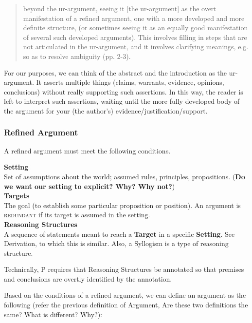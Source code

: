 \documentclass{article}
\begin{document}
\begin{quote}
beyond the ur-argument, seeing it [the ur-argument] as the overt manifestation of a refined argument, one with a more developed and more definite structure, (or sometimes seeing it as an equally good manifestation of several such developed arguments).  This involves filling in steps that are not articulated in the ur-argument, and it involves clarifying meanings, e.g. so as to resolve ambiguity (pp. 2-3). 
\end{quote} 
\begin{remark}
For our purposes, we can think of the abstract and the introduction as the ur-argument. It asserts multiple things (claims, warrants, evidence, opinions, conclusions) without really supporting such assertions. In this way, the reader is left to interpret such assertions, waiting until the more fully developed body of the argument for your (the author's) evidence/justification/support.
\end{remark} 

\subsubsection{Refined Argument}
A refined argument must meet the following conditions.

\textbf{Setting}\\
Set of assumptions about the world; assumed rules, principles, propositions. (\textbf{Do we want our setting to explicit? Why? Why not?})
\\
 
\textbf{Targets}\\
The goal (to establish some particular proposition or position). An argument is \textsc{redundant} if its target is assumed in the setting.
\\ 

\textbf{Reasoning Structures}\\
A sequence of statements meant to reach a {\bf Target} in a specific {\bf Setting}. See {\sc Derivation}, to which this is similar. Also, a {\sc Syllogism} is a type of reasoning structure. 

\begin{remark}
Technically, P requires that Reasoning Structures be annotated so that premises and conclusions are overtly identified by the annotation.
\end{remark}

Based on the conditions of a refined argument, we can define an argument as the following (refer the previous definition of {\sc Argument}, Are these two definitions the same? What is different? Why?):
\end{document}
